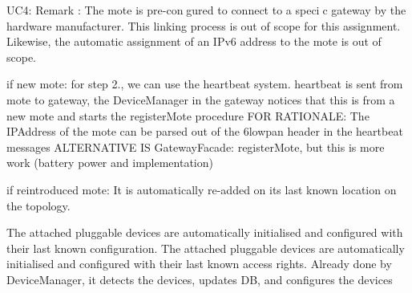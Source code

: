         UC4:
            Remark : The mote is pre-congured to connect to a specic gateway by
             the hardware manufacturer. This linking process is out of scope for
             this assignment. Likewise, the automatic assignment of an IPv6 address
             to the mote is out of scope.

            if new mote:
                for step 2., we can use the heartbeat system. heartbeat is sent from mote to gateway,
                the DeviceManager in the gateway notices that this is from a new mote and starts
                the registerMote procedure
                FOR RATIONALE: The IPAddress of the mote can be parsed out of the 6lowpan header in the heartbeat messages
                ALTERNATIVE IS GatewayFacade: registerMote, but this is more work (battery power and implementation)

        if reintroduced mote:
            It is automatically re-added on its last known location on the topology.

            The attached pluggable devices are automatically initialised and configured with their last known configuration.
            The attached pluggable devices are automatically initialised and configured with their last known access rights.
                Already done by DeviceManager, it detects the devices, updates DB, and configures the devices


